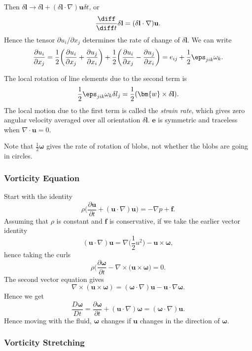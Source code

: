 \documentclass[12pt]{article}
\begin{document}
Then $\delta \mathbf{l} \to \delta \mathbf{l} + (\delta \mathbf{l} \cdot \nabla) \mathbf{u} \delta t$, or
\[
\frac{\diff}{\diff t} \delta \mathbf{l} = (\delta \mathbf{l} \cdot \nabla) \mathbf{u}
.\]
Hence the tensor $\partial u_i/\partial x_j$ determines the rate of change of $\delta \mathbf{l}$. We can write
\[
\frac{\partial u_i}{\partial x_j} = \frac{1}{2} \biggl( \frac{\partial u_i}{\partial x_j} + \frac{\partial u_j}{\partial x_i} \biggr) + \frac{1}{2} \biggl( \frac{\partial u_i}{\partial x_j} - \frac{\partial u_j}{\partial x_i} \biggr) = e_{ij} + \frac{1}{2} \eps_{jik} \omega_{k}
.\]


The local rotation of line elements due to the second term is
\[
\frac{1}{2} \eps_{jik}\omega_k \delta l_j = \frac{1}{2} (\bm{w} \times \delta \mathbf{l})
.\]
The local motion due to the first term is called the \emph{strain rate}, which gives zero angular velocity averaged over all orientation $\delta \mathbf{l}$. $\mathbf{e}$ is symmetric and traceless when $\nabla \cdot \mathbf{u} = 0$.

Note that $\frac{1}{2} \bm{\omega}$ gives the rate of rotation of blobs, not whether the blobs are going in circles.

\subsubsection{Vorticity Equation}
\label{subsub:vorticity_equation}

Start with the identity
\[
\rho \biggl( \frac{\partial \mathbf{u}}{\partial t} + (\mathbf{u} \cdot \nabla) \mathbf{u} \biggr) = - \nabla p + \mathbf{f}
.\]
Assuming that $\rho$ is constant and $\mathbf{f}$ is conservative, if we take the earlier vector identity
\[
	(\mathbf{u} \cdot \nabla) \mathbf{u} = \nabla \biggl( \frac{1}{2} u^2 \biggr) - \mathbf{u} \times \bm{\omega}
,\]
hence taking the curls
\[
\rho \biggl( \frac{\partial \bm{\omega}}{\partial t} - \nabla \times (\mathbf{u} \times \bm{\omega}  \biggr) = 0
.\]
The second vector equation gives
\[
\nabla \times (\mathbf{u} \times \bm{\omega}) = (\bm{\omega} \cdot \nabla) \mathbf{u} - \mathbf{u} \cdot \nabla \bm{\omega}
.\]
Hence we get
\[
\frac{D \bm{\omega}}{D t} = \frac{\partial \bm{\omega}}{\partial t} + (\mathbf{u} \cdot \nabla) \bm{\omega} = (\bm{\omega} \cdot \nabla) \mathbf{u}
.\]
Hence moving with the fluid, $\bm{\omega}$ changes if $\mathbf{u}$ changes in the direction of $\bm{\omega}$.

\subsubsection{Vorticity Stretching}
\label{subsub:vorticity_stretching}
\end{document}
